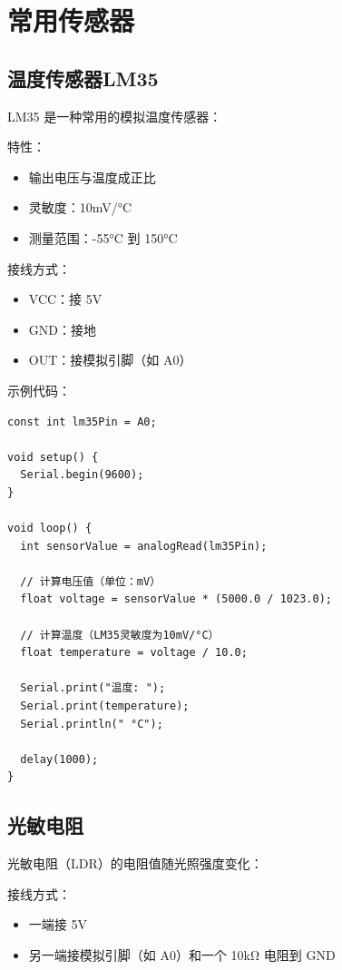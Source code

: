 \documentclass[12pt,UTF8]{ctexbook}
\begin{document}
\chapter{常用传感器}

\section{温度传感器LM35}

LM35 是一种常用的模拟温度传感器：

特性：
\begin{itemize}
    \item 输出电压与温度成正比
    \item 灵敏度：10mV/°C
    \item 测量范围：-55°C 到 150°C
\end{itemize}

接线方式：
\begin{itemize}
    \item VCC：接 5V
    \item GND：接地
    \item OUT：接模拟引脚（如 A0）
\end{itemize}

示例代码：
\begin{lstlisting}
const int lm35Pin = A0;

void setup() {
  Serial.begin(9600);
}

void loop() {
  int sensorValue = analogRead(lm35Pin);
  
  // 计算电压值（单位：mV）
  float voltage = sensorValue * (5000.0 / 1023.0);
  
  // 计算温度（LM35灵敏度为10mV/°C）
  float temperature = voltage / 10.0;
  
  Serial.print("温度: ");
  Serial.print(temperature);
  Serial.println(" °C");
  
  delay(1000);
}
\end{lstlisting}

\section{光敏电阻}

光敏电阻（LDR）的电阻值随光照强度变化：

接线方式：
\begin{itemize}
    \item 一端接 5V
    \item 另一端接模拟引脚（如 A0）和一个 10kΩ 电阻到 GND
\end{itemize}
\end{document}
